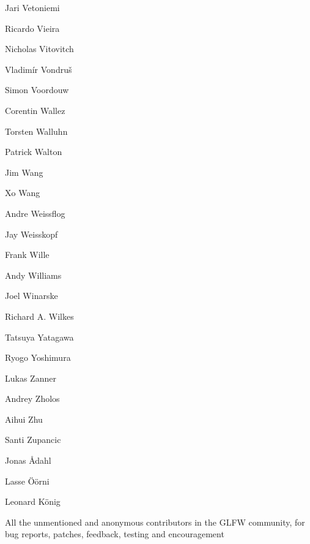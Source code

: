 \begin{DoxyItemize}
\item Jari Vetoniemi
\item Ricardo Vieira
\item Nicholas Vitovitch
\item Vladimír Vondruš
\item Simon Voordouw
\item Corentin Wallez
\item Torsten Walluhn
\item Patrick Walton
\item Jim Wang
\item Xo Wang
\item Andre Weissflog
\item Jay Weisskopf
\item Frank Wille
\item Andy Williams
\item Joel Winarske
\item Richard A. Wilkes
\item Tatsuya Yatagawa
\item Ryogo Yoshimura
\item Lukas Zanner
\item Andrey Zholos
\item Aihui Zhu
\item Santi Zupancic
\item Jonas Ådahl
\item Lasse Öörni
\item Leonard König
\item All the unmentioned and anonymous contributors in the GLFW community, for bug reports, patches, feedback, testing and encouragement 
\end{DoxyItemize}